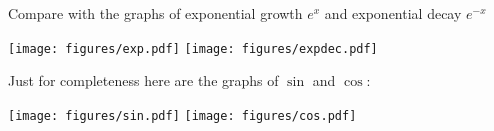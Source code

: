 \documentclass[10pt,aspectratio=169]{beamer}
\begin{document}
\begin{frame}
Compare with the graphs of exponential growth $e^x$ and exponential decay
$e^{-x}$

\begin{center}
\texttt{[image: figures/exp.pdf]}\quad%
\texttt{[image: figures/expdec.pdf]}
\end{center}

\end{frame}

\begin{frame}
Just for completeness here are the graphs of $\sin$ and $\cos$:

\begin{center}
\texttt{[image: figures/sin.pdf]}\quad%
\texttt{[image: figures/cos.pdf]}
\end{center}

\end{frame}
\end{document}
